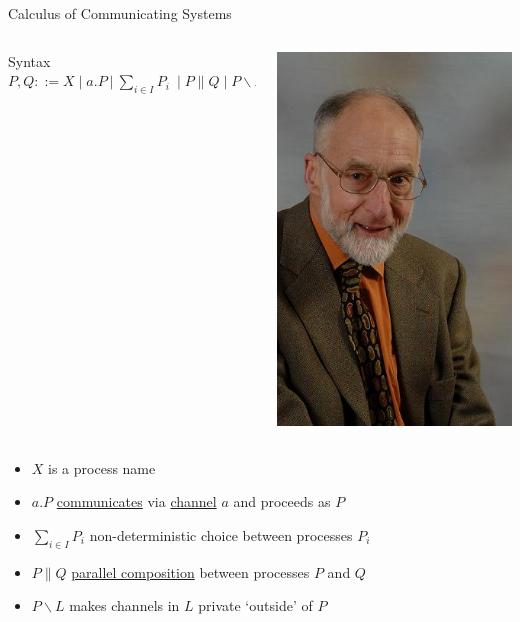 \documentclass{beamer}
\begin{document}
\begin{frame}{Calculus of Communicating Systems}

  \begin{minipage}[0.3\textheight]{\textwidth}
  \begin{columns}[c]
  \begin{column}{0.8\textwidth}
    \begin{block}{Syntax}
      $P,Q ::= X \mid a . P\ |\ \sum_{ i \in I} P_i \ \mid P \parallel Q 
      \mid P \backslash L \mid \dots$
    \end{block}
  \end{column}
  \begin{column}{0.23\textwidth}
    \includegraphics[scale=0.25]{images/Milner.jpg}
  \end{column}
  \end{columns}
  \end{minipage}
  \begin{itemize}
  \item $X$ is a process name
  \item $a. P$ \alert{\underline{communicates}} via \alert{\underline{channel}} $a$ and proceeds as $P$
  \item $\sum_{ i \in I} P_i$ non-deterministic choice between processes $P_i$
  \item $P \parallel Q$ \alert{\underline{parallel composition}}
          between processes $P$ and $Q$
  \item $P \backslash L$ makes channels in $L$ private `outside' of $P$
  \end{itemize}
\end{frame}
\end{document}
